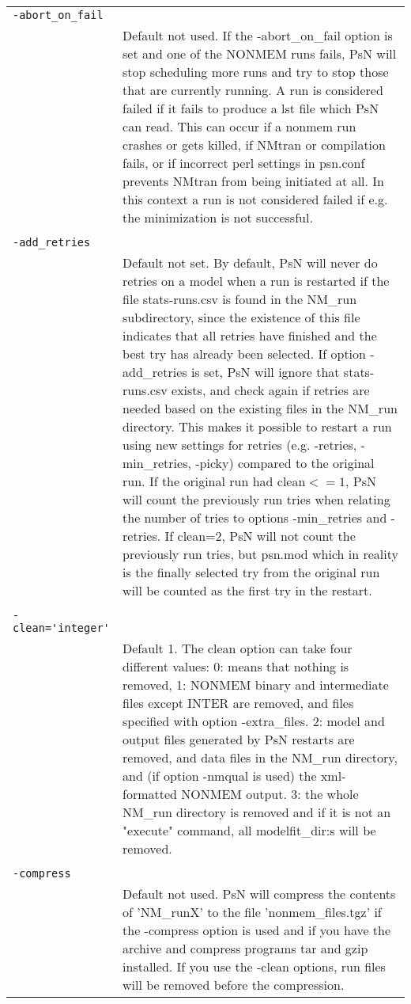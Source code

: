 \documentclass[a4paper,12pt]{article}
\begin{document}
\begin{longtable}{p{1in}p{4in}}
\verb|-abort_on_fail| & \\
\nopagebreak
 & Default not used. If the -abort\_on\_fail option is set and one of the NONMEM runs fails, PsN will stop scheduling more runs and try to stop those that are currently running. A run is considered failed if it fails to produce a lst file which PsN can read. This can occur if a nonmem run crashes or gets killed, if NMtran or compilation fails, or if incorrect perl settings in psn.conf prevents NMtran from being initiated at all. In this context a run is not considered failed if e.g. the minimization is not successful.  \\
\\
\verb|-add_retries| & \\
\nopagebreak
 & Default not set. By default, PsN will never do retries on a model when a run is restarted if the file stats-runs.csv is found in the NM\_run subdirectory, since the existence of this file indicates that all retries have finished and the best try has already been selected. If option -add\_retries is set, PsN will ignore that stats-runs.csv exists, and check again if retries are needed based on the existing files in the NM\_run directory. This makes it possible to restart a run using new settings for retries (e.g. -retries, -min\_retries, -picky) compared to the original run. If the original run had clean$<=1$, PsN will count the previously run tries when relating the number of tries to options -min\_retries and -retries. If clean=2, PsN will not count the previously run tries, but psn.mod which in reality is the finally selected try from the original run will be counted as the first try in the restart.  \\
\\
\verb|-clean='integer'| & \\
\nopagebreak
 & Default 1. The clean option can take four different values:  0: means that nothing is removed, 1: NONMEM binary and intermediate files except INTER are removed, and files specified with option -extra\_files. 2: model and output files generated by PsN restarts are removed, and data files in the NM\_run directory, and (if option -nmqual is used) the xml-formatted NONMEM output. 3: the whole NM\_run directory is removed and if it is not an "execute" command, all modelfit\_dir:s will be removed. \\
\\
\verb|-compress | & \\
\nopagebreak
 & Default not used. PsN will compress the contents of 'NM\_runX' to the file 'nonmem\_files.tgz' if the -compress option is used and if you have the archive and compress programs tar and gzip installed. If you use the -clean options, run files will be removed before the compression.  \\

\end{longtable}
\end{document}
